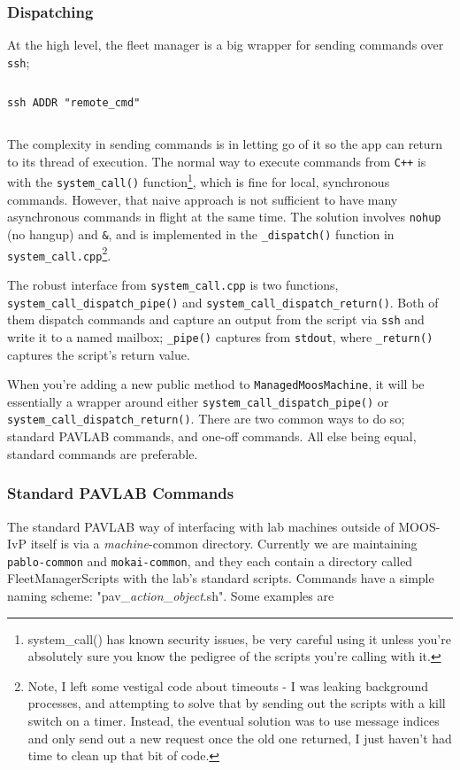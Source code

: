 \documentclass[11pt]{article}
\newcommand{\cmdline}[1]{\vspace{.2em} $\:$\\ \begin{minipage}{\dimexpr\textwidth-2cm}
\texttt{#1}
\end{minipage} $\:$\\ \vspace{-.2em} }
\begin{document}
\subsubsection{Dispatching}
At the high level, the fleet manager is a big wrapper for sending commands over \texttt{ssh};

\cmdline{ssh ADDR "remote\_cmd"}

The complexity in sending commands is in letting go of it so the app can return to its thread of execution. The normal way to execute commands from \texttt{C++} is with the \texttt{system\_call()} function\footnote{system\_call() has known security issues, be very careful using it unless you're absolutely sure you know the pedigree of the scripts you're calling with it.}, which is fine for local, synchronous commands. However, that naive approach is not sufficient to have many asynchronous commands in flight at the same time. The solution involves \texttt{nohup} (no hangup) and \texttt{\&}, and is implemented in the \texttt{\_dispatch()} function in \texttt{system\_call.cpp}\footnote{Note, I left some vestigal code about timeouts - I was leaking background processes, and attempting to solve that by sending out the scripts with a kill switch on a timer. Instead, the eventual solution was to use message indices and only send out a new request once the old one returned, I just haven't had time to clean up that bit of code.}.

The robust interface from \texttt{system\_call.cpp} is two functions, \texttt{system\_call\_dispatch\_pipe()} and \texttt{system\_call\_dispatch\_return()}. Both of them dispatch commands and capture an output from the script via \texttt{ssh} and write it to a named mailbox; \texttt{\_pipe()} captures from \texttt{stdout}, where \texttt{\_return()} captures the script's return value.

When you're adding a new public method to \texttt{ManagedMoosMachine}, it will be essentially a wrapper around either \texttt{system\_call\_dispatch\_pipe()} or \texttt{system\_call\_dispatch\_return()}. There are two common ways to do so; standard PAVLAB commands, and one-off commands. All else being equal, standard commands are preferable.

\subsubsection{Standard PAVLAB Commands}

The standard PAVLAB way of interfacing with lab machines outside of MOOS-IvP itself is via a \textit{machine}-common directory. Currently we are maintaining \texttt{pablo-common} and \texttt{mokai-common}, and they each contain a directory called FleetManagerScripts with the lab's standard scripts. Commands have a simple naming scheme: "pav\_\textit{action}\_\textit{object}.sh". Some examples are 
\end{document}
